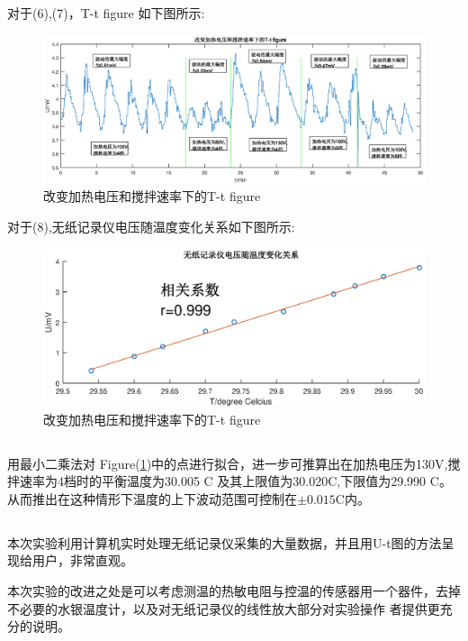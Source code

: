 ﻿\documentclass[10.5pt]{article}
\begin{document}
对于(6),(7)，T-t figure 如下图所示:
\begin{figure}[!ht]
\centering
\caption{改变加热电压和搅拌速率下的T-t figure}
\includegraphics[width=400pt]{ConstTemperature/Figure5.eps}
\end{figure}


对于(8),无纸记录仪电压随温度变化关系如下图所示:
\begin{figure}[!ht]
\centering
\caption{改变加热电压和搅拌速率下的T-t figure \label{fig:UT}}
\includegraphics[width=400pt]{ConstTemperature/Figure6.eps}
\end{figure}
\newpage
\subsection{\textbf{}}

用最小二乘法对 Figure(\ref{fig:UT})中的点进行拟合，进一步可推算出在加热电压为130V,搅拌速率为4档时的平衡温度为30.005 \degree C
及其上限值为30.020\degree C,下限值为29.990 \degree C。从而推出在这种情形下温度的上下波动范围可控制在$\pm0.015$\degree C内。
\subsection{\textbf{}}
本次实验利用计算机实时处理无纸记录仪采集的大量数据，并且用U-t图的方法呈现给用户，非常直观。

本次实验的改进之处是可以考虑测温的热敏电阻与控温的传感器用一个器件，去掉不必要的水银温度计，以及对无纸记录仪的线性放大部分对实验操作
者提供更充分的说明。
\end{document}
